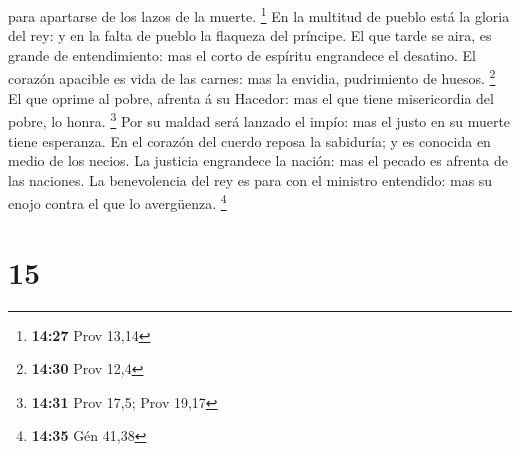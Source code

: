 para apartarse de los lazos de la muerte. \footnote{\textbf{14:27} Prov
  13,14}  En la multitud de pueblo está la gloria del rey:
y en la falta de pueblo la flaqueza del príncipe.  El que
tarde se aira, es grande de entendimiento: mas el corto de espíritu
engrandece el desatino.  El corazón apacible es vida de las
carnes: mas la envidia, pudrimiento de huesos. \footnote{\textbf{14:30}
  Prov 12,4}  El que oprime al pobre, afrenta á su Hacedor:
mas el que tiene misericordia del pobre, lo honra. \footnote{\textbf{14:31}
  Prov 17,5; Prov 19,17}  Por su maldad será lanzado el
impío: mas el justo en su muerte tiene esperanza.  En el
corazón del cuerdo reposa la sabiduría; y es conocida en medio de los
necios.  La justicia engrandece la nación: mas el pecado es
afrenta de las naciones.  La benevolencia del rey es para
con el ministro entendido: mas su enojo contra el que lo avergüenza.
\footnote{\textbf{14:35} Gén 41,38}

\hypertarget{section-14}{%
\section{15}\label{section-14}}

